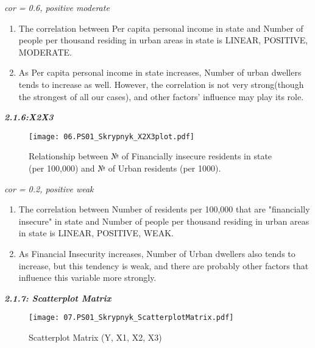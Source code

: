 \documentclass[12pt,letterpaper]{article}
\begin{document}
\noindent 
\centering
\textit{cor = 0.6, positive moderate} 

\begin{enumerate}[$\circ$]
	\item The correlation between Per capita personal income in state and Number of people per thousand residing in urban areas in state is LINEAR, POSITIVE, MODERATE.
	\item As Per capita personal income in state increases, Number of urban dwellers tends to increase as well. However, the correlation is not very strong(though the strongest of all our cases), and other factors' influence may play its role.
	\vspace{5cm}
	
\end{enumerate} 

\noindent \begin{center}
	\textbf {\textit{2.1.6:X2X3}}
\end{center}

\begin{figure}[H]
	\centering
	\caption{\footnotesize Relationship between № of Financially insecure residents in state (per 100,000) and № of Urban residents (per 1000).}
	\label{fig:plot_6}
	\texttt{[image: 06.PS01\_Skrypnyk\_X2X3plot.pdf]}
\end{figure}

\noindent 
\centering
\textit{cor = 0.2, positive weak} 

\begin{enumerate}[$\circ$]
	\item The correlation between Number of residents per 100,000 that are "financially insecure" in state and Number of people per thousand  residing in urban areas in state is LINEAR, POSITIVE, WEAK.
	\item As Financial Insecurity increases, Number of Urban dwellers also tends to increase, but this tendency is weak, and there are probably other factors that influence this variable more strongly. 
	\vspace{5cm}
	
\end{enumerate}  

\noindent \begin{center}
	\textbf {\textit{2.1.7: Scatterplot Matrix}}
\end{center}

\begin{figure}[H]
	\centering
	\caption{\footnotesize Scatterplot Matrix (Y, X1, X2, X3)}
	\label{fig:plot_7}
	\texttt{[image: 07.PS01\_Skrypnyk\_ScatterplotMatrix.pdf]}
\end{figure}
\end{document}
